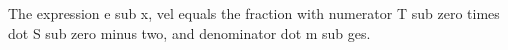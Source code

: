 The expression e sub x, vel equals the fraction with numerator T sub zero times dot S sub zero minus two, and denominator dot m sub ges.